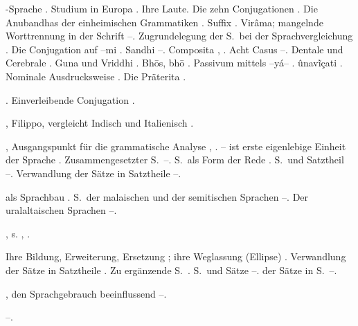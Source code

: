 \begin{register}
-Sprache \pageref{sp.22}. Studium in Europa \pageref{sp.26}. Ihre Laute\pageref{sp.34}. Die zehn Conjugationen \pageref{sp.116}. Die Anubandhas der einheimischen Grammatiken \pageref{sp.119}. Suffix  \pageref{sp.123}. Virâma; mangelnde Worttrennung in der Schrift \pageref{sp.131}–\pageref{sp.132}. Zugrundelegung der S.~bei der  Sprachvergleichung \sed{\pageref{sp.141},} \pageref{sp.186}. Die Conjugation auf –mi \pageref{sp.186}. Sandhi \pageref{sp.199}–\pageref{sp.200}. Composita \pageref{sp.236}, \pageref{sp.466}.  Acht Casus \pageref{sp.253}–\pageref{sp.254}. Dentale und Cerebrale \pageref{sp.269}. Guna und Vriddhi \pageref{sp.352}. Bh\=os, bh\=o \pageref{sp.360}.  Passivum mittels –yá– \pageref{sp.397}. ûnavĩçati \pageref{sp.402}. Nominale Ausdrucksweise \pageref{sp.425}. Die Präterita \pageref{sp.446}.

 \pageref{sp.249}\sed{, \pageref{sp.390}}. Einverleibende Conjugation \pageref{sp.358}.

, Filippo, vergleicht Indisch und Italienisch \pageref{sp.25}.

, Ausgangspunkt für die grammatische Analyse \pageref{sp.86}, \pageref{sp.89}. – ist erste eigenlebige Einheit der Sprache \pageref{sp.88}. Zusammengesetzter S.~\pageref{sp.103}–\pageref{sp.104}. S.~als Form der Rede \pageref{sp.322}. S.~und Satztheil \pageref{sp.451}–\pageref{sp.456}. Verwandlung der Sätze in Satztheile \pageref{sp.463}–\pageref{sp.470}.

 als Sprachbau \pageref{sp.81}. S.~der malaischen und der semitischen Sprachen \pageref{sp.413}–\pageref{sp.414}. Der uralaltaischen Sprachen \pageref{sp.418}–\pageref{sp.419}.

, s. , .

 Ihre Bildung, Erweiterung, Ersetzung \pageref{sp.101}; ihre Weglassung (Ellipse) \pageref{sp.101}. Verwandlung der Sätze in Satztheile \pageref{sp.104}. Zu ergänzende S.~\pageref{sp.366}. S.~und Sätze \pageref{sp.451}–\pageref{sp.456}.  der Sätze in S.~\pageref{sp.463}–\pageref{sp.470}.

, den Sprachgebrauch beeinflussend \pageref{sp.245}–\pageref{sp.250}.

 \pageref{sp.103}–\pageref{sp.104}.


\end{register}
